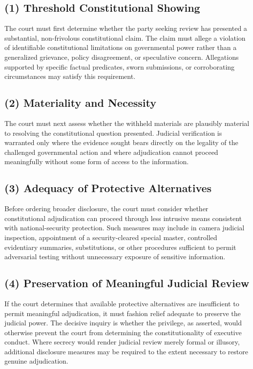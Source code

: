 \documentclass[12pt]{article}
\begin{document}
\subsection*{(1) Threshold Constitutional Showing}
The court must first determine whether the party seeking review has presented a substantial, non-frivolous constitutional claim.
The claim must allege a violation of identifiable constitutional limitations on governmental power rather than a generalized grievance, policy disagreement, or speculative concern.
Allegations supported by specific factual predicates, sworn submissions, or corroborating circumstances may satisfy this requirement.

\subsection*{(2) Materiality and Necessity}
The court must next assess whether the withheld materials are plausibly material to resolving the constitutional question presented.
Judicial verification is warranted only where the evidence sought bears directly on the legality of the challenged governmental action and where adjudication cannot proceed meaningfully without some form of access to the information.

\subsection*{(3) Adequacy of Protective Alternatives}
Before ordering broader disclosure, the court must consider whether constitutional adjudication can proceed through less intrusive means consistent with national-security protection.
Such measures may include in camera judicial inspection, appointment of a security-cleared special master, controlled evidentiary summaries, substitutions, or other procedures sufficient to permit adversarial testing without unnecessary exposure of sensitive information.

\subsection*{(4) Preservation of Meaningful Judicial Review}
If the court determines that available protective alternatives are insufficient to permit meaningful adjudication, it must fashion relief adequate to preserve the judicial power.
The decisive inquiry is whether the privilege, as asserted, would otherwise prevent the court from determining the constitutionality of executive conduct.
Where secrecy would render judicial review merely formal or illusory, additional disclosure measures may be required to the extent necessary to restore genuine adjudication.
\end{document}
